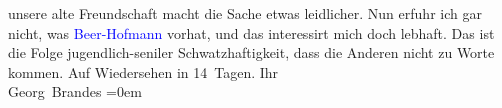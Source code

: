                     unsere alte Freundschaft macht die Sache etwas leidlicher.\pend
           \pstart
           Nun erfuhr ich gar nicht, was \textcolor{blue}{Beer-Hofmann}{}\ledrightnote{\textcolor{blue}{Richard Beer-Hofmann}}
                    vorhat, und das interessirt mich doch lebhaft. Das ist die Folge
                    jugendlich-seniler Schwatzhaftigkeit, dass die Anderen nicht zu Worte
                    kommen.\pend
           \pstart
           Auf Wiedersehen in 14 Tagen.\pend
           \pstart
           Ihr{\\[\baselineskip]}\spacefill\mbox{Georg Brandes}\pend
           \leftskip=0em{}\endnumbering{}  
      